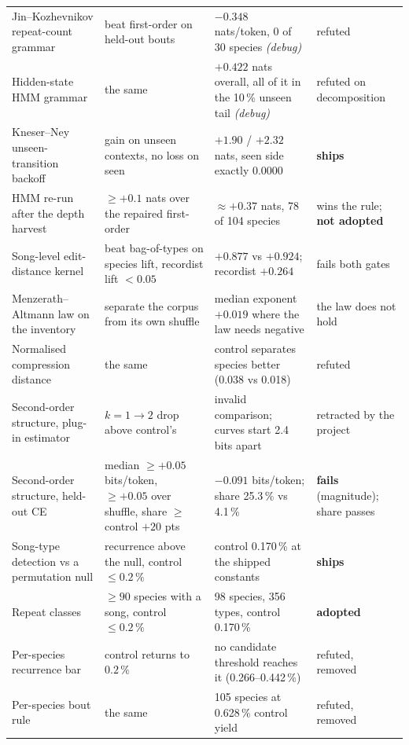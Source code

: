 \documentclass[10pt,twocolumn,a4paper]{article}
\begin{document}
\begin{longtable}{L{3.9cm} L{3.6cm} L{4.6cm} L{2.5cm}}
Jin--Kozhevnikov repeat-count grammar & beat first-order on held-out bouts & $-0.348$ nats/token, 0 of 30 species \emph{(debug)} & refuted \\
Hidden-state HMM grammar & the same & $+0.422$ nats overall, all of it in the 10\,\% unseen tail \emph{(debug)} & refuted on decomposition \\
Kneser--Ney unseen-transition backoff & gain on unseen contexts, no loss on seen & $+1.90$ / $+2.32$ nats, seen side exactly 0.0000 & \textbf{ships} \\
HMM re-run after the depth harvest & $\ge +0.1$ nats over the repaired first-order & $\approx +0.37$ nats, 78 of 104 species & wins the rule; \textbf{not adopted} \\
Song-level edit-distance kernel & beat bag-of-types on species lift, recordist lift $< 0.05$ & $+0.877$ vs $+0.924$; recordist $+0.264$ & fails both gates \\
Menzerath--Altmann law on the inventory & separate the corpus from its own shuffle & median exponent $+0.019$ where the law needs negative & the law does not hold \\
Normalised compression distance & the same & control separates species better (0.038 vs 0.018) & refuted \\
Second-order structure, plug-in estimator & $k{=}1 \to 2$ drop above control's & invalid comparison; curves start 2.4 bits apart & retracted by the project \\
Second-order structure, held-out CE & median $\ge +0.05$ bits/token, $\ge +0.05$ over shuffle, share $\ge$ control $+20$ pts & $-0.091$ bits/token; share 25.3\,\% vs 4.1\,\% & \textbf{fails} (magnitude); share passes \\
Song-type detection vs a permutation null & recurrence above the null, control $\le 0.2\,\%$ & control 0.170\,\% at the shipped constants & \textbf{ships} \\
Repeat classes & $\ge 90$ species with a song, control $\le 0.2\,\%$ & 98 species, 356 types, control 0.170\,\% & \textbf{adopted} \\
Per-species recurrence bar & control returns to $0.2\,\%$ & no candidate threshold reaches it (0.266--0.442\,\%) & refuted, removed \\
Per-species bout rule & the same & 105 species at 0.628\,\% control yield & refuted, removed \\


\end{longtable}
\end{document}
